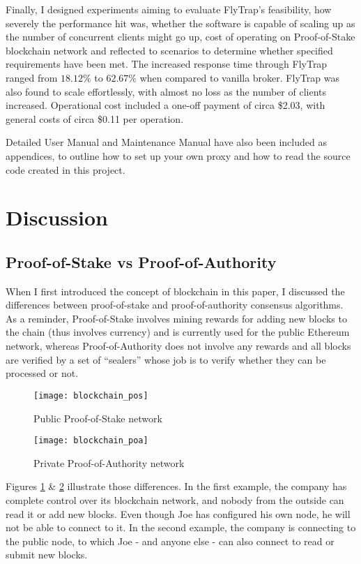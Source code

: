 Finally, I designed experiments aiming to evaluate FlyTrap's feasibility, how severely the performance hit was, whether the software is capable of scaling up as the number of concurrent clients might go up, cost of operating on Proof-of-Stake blockchain network and reflected to scenarios to determine whether specified requirements have been met. The increased response time through FlyTrap ranged from $18.12\%$ to $62.67\%$ when compared to vanilla broker. FlyTrap was also found to scale effortlessly, with almost no loss as the number of clients increased. Operational cost included a one-off payment of circa \$2.03, with general costs of circa \$0.11 per operation.

Detailed User Manual and Maintenance Manual have also been included as appendices, to outline how to set up your own proxy and how to read the source code created in this project.

\section{Discussion}

\subsection{Proof-of-Stake vs Proof-of-Authority}
When I first introduced the concept of blockchain in this paper, I discussed the differences between proof-of-stake and proof-of-authority consensus algorithms. As a reminder, Proof-of-Stake involves mining rewards for adding new blocks to the chain (thus involves currency) and is currently used for the public Ethereum network, whereas Proof-of-Authority does not involve any rewards and all blocks are verified by a set of ``sealers'' whose job is to verify whether they can be processed or not.

\begin{figure}[h]
    \centering
    \texttt{[image: blockchain\_pos]}
    \caption{Public Proof-of-Stake network}
    \label{fig:blockchain_pos}
\end{figure}
\begin{figure}[h]
    \centering
    \texttt{[image: blockchain\_poa]}
    \caption{Private Proof-of-Authority network}
    \label{fig:blockchain_poa}
\end{figure}

Figures \ref{fig:blockchain_pos} \& \ref{fig:blockchain_poa} illustrate those differences. In the first example, the company has complete control over its blockchain network, and nobody from the outside can read it or add new blocks. Even though Joe has configured his own node, he will not be able to connect to it. In the second example, the company is connecting to the public node, to which Joe - and anyone else - can also connect to read or submit new blocks.

